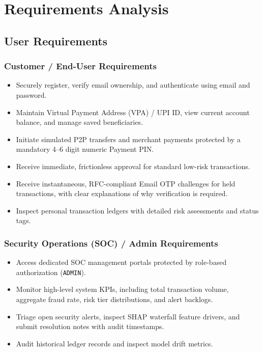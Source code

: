 \chapter{Requirements Analysis}
\label{chap:requirements}

\section{User Requirements}
\subsection{Customer / End-User Requirements}
\begin{itemize}
    \item Securely register, verify email ownership, and authenticate using email and password.
    \item Maintain Virtual Payment Address (VPA) / UPI ID, view current account balance, and manage saved beneficiaries.
    \item Initiate simulated P2P transfers and merchant payments protected by a mandatory 4--6 digit numeric Payment PIN.
    \item Receive immediate, frictionless approval for standard low-risk transactions.
    \item Receive instantaneous, RFC-compliant Email OTP challenges for held transactions, with clear explanations of why verification is required.
    \item Inspect personal transaction ledgers with detailed risk assessments and status tags.
\end{itemize}

\subsection{Security Operations (SOC) / Admin Requirements}
\begin{itemize}
    \item Access dedicated SOC management portals protected by role-based authorization (\texttt{ADMIN}).
    \item Monitor high-level system KPIs, including total transaction volume, aggregate fraud rate, risk tier distributions, and alert backlogs.
    \item Triage open security alerts, inspect SHAP waterfall feature drivers, and submit resolution notes with audit timestamps.
    \item Audit historical ledger records and inspect model drift metrics.
\end{itemize}

